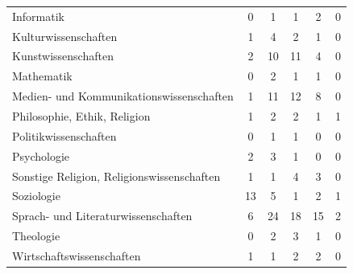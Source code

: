 \documentclass{scrartcl}
\begin{document}
\begin{landscape}
\begin{longtable}{L{7.5cm}ccccc}
      Informatik                                   &  0                    &  1                       &  1                       &  2                   & 0                       \\
      Kulturwissenschaften                         &  1                    &  4                       &  2                       &  1                   & 0                       \\
      Kunstwissenschaften                          &  2                    & 10                       & 11                       &  4                   & 0                       \\
      Mathematik                                   &  0                    &  2                       &  1                       &  1                   & 0                       \\
      Medien- und Kommunikationswissenschaften     &  1                    & 11                       & 12                       &  8                   & 0                       \\
      Philosophie, Ethik, Religion                 &  1                    &  2                       &  2                       &  1                   & 1                       \\
      Politikwissenschaften                        &  0                    &  1                       &  1                       &  0                   & 0                       \\
      Psychologie                                  &  2                    &  3                       &  1                       &  0                   & 0                       \\
      Sonstige Religion, Religionswissenschaften   &  1                    &  1                       &  4                       &  3                   & 0                       \\
      Soziologie                                   & 13                    &  5                       &  1                       &  2                   & 1                       \\
      Sprach- und Literaturwissenschaften          &  6                    & 24                       & 18                       & 15                   & 2                       \\
      Theologie                                    &  0                    &  2                       &  3                       &  1                   & 0                       \\
      Wirtschaftswissenschaften                    &  1                    &  1                       &  2                       &  2                   & 0                       \\
   \end{longtable}


\end{landscape}
\end{document}
